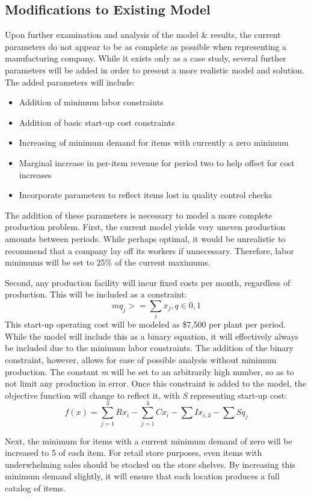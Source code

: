 \documentclass{article}
\begin{document}
\subsection{Modifications to Existing Model}
Upon further examination and analysis of the model \& results, the current parameters do not appear to be as complete as possible when representing a manufacturing company.  While it exists only as a case study, several further parameters will be added in order to present a more realistic model and solution.  The added parameters will include:
\begin{itemize}
	\item Addition of minimum labor constraints
	\item Addition of basic start-up cost constraints
	\item Increasing of minimum demand for items with currently a zero minimum
	\item Marginal increase in per-item revenue for period two to help offset for cost increases
	\item Incorporate parameters to reflect items lost in quality control checks
\end{itemize}
The addition of these parameters is necessary to model a more complete production problem.  First, the current model yields very uneven production amounts between periods.  While perhaps optimal, it would be unrealistic to recommend that a company lay off its workers if unnecessary.  Therefore, labor minimums will be set to 25\% of the current maximums.
\par
Second, any production facility will incur fixed costs per month, regardless of production.  This will be included as a constraint:
$$ mq_{j} >= \sum_{i} x_{j}, q\in {0,1} $$
This start-up operating cost will be modeled as \$7,500 per plant per period.  While the model will include this as a binary equation, it will effectively always be included due to the minimum labor constraints.  The addition of the binary constraint, however, allows for ease of possible analysis without minimum production.  The constant \textit{m} will be set to an arbitrarily high number, so as to not limit any production in error.  Once this constraint is added to the model, the objective function will change to reflect it, with \textit{S} representing start-up cost:
$$f(x) = \sum_{j=1}^{3}Rx_{i} - \sum_{j=1}^{3}Cx_{i} - \sum Ix_{i,3} -\sum Sq_{j}$$
\par
Next, the minimum for items with a current minimum demand of zero will be increased to 5 of each item.  For retail store purposes, even items with underwhelming sales should be stocked on the store shelves.  By increasing this minimum demand slightly, it will ensure that each location produces a full catalog of items.  
\end{document}
